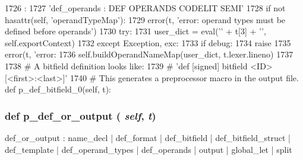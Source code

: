 \begin{DoxyCode}
1726                                :
1727         'def_operands : DEF OPERANDS CODELIT SEMI'
1728         if not hasattr(self, 'operandTypeMap'):
1729             error(t, 'error: operand types must be defined before operands')
1730         try:
1731             user_dict = eval('{' + t[3] + '}', self.exportContext)
1732         except Exception, exc:
1733             if debug:
1734                 raise
1735             error(t, 'error: %
1736         self.buildOperandNameMap(user_dict, t.lexer.lineno)
1737 
1738     # A bitfield definition looks like:
1739     # 'def [signed] bitfield <ID> [<first>:<last>]'
1740     # This generates a preprocessor macro in the output file.
    def p_def_bitfield_0(self, t):
\end{DoxyCode}
\hypertarget{classisa__parser_1_1ISAParser_aee60b0ae213167ea6100bc4bea915eaf}{
\subsubsection[{p\_\-def\_\-or\_\-output}]{\setlength{\rightskip}{0pt plus 5cm}def p\_\-def\_\-or\_\-output ( {\em self}, \/   {\em t})}}
\label{classisa__parser_1_1ISAParser_aee60b0ae213167ea6100bc4bea915eaf}
\begin{DoxyVerb}def_or_output : name_decl
         | def_format
         | def_bitfield
         | def_bitfield_struct
         | def_template
         | def_operand_types
         | def_operands
         | output
         | global_let
         | split\end{DoxyVerb}
 


